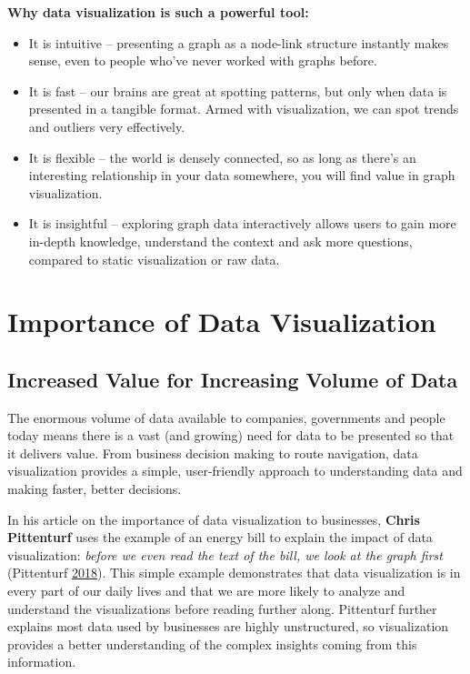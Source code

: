\documentclass[]{book}
\providecommand{\tightlist}{%
  \setlength{\itemsep}{0pt}\setlength{\parskip}{0pt}}
\theoremstyle{definition}
\theoremstyle{definition}
\theoremstyle{definition}
\theoremstyle{remark}
\begin{document}
\textbf{Why data visualization is such a powerful tool:}

\begin{itemize}
\tightlist
\item
  It is intuitive -- presenting a graph as a node-link structure
  instantly makes sense, even to people who've never worked with graphs
  before.
\item
  It is fast -- our brains are great at spotting patterns, but only when
  data is presented in a tangible format. Armed with visualization, we
  can spot trends and outliers very effectively.
\item
  It is flexible -- the world is densely connected, so as long as
  there's an interesting relationship in your data somewhere, you will
  find value in graph visualization.
\item
  It is insightful -- exploring graph data interactively allows users to
  gain more in-depth knowledge, understand the context and ask more
  questions, compared to static visualization or raw data.
\end{itemize}

\section{Importance of Data
Visualization}\label{importance-of-data-visualization}

\subsection{Increased Value for Increasing Volume of
Data}\label{increased-value-for-increasing-volume-of-data}

The enormous volume of data available to companies, governments and
people today means there is a vast (and growing) need for data to be
presented so that it delivers value. From business decision making to
route navigation, data visualization provides a simple, user-friendly
approach to understanding data and making faster, better decisions.

In his article on the importance of data visualization to businesses,
\textbf{Chris Pittenturf} uses the example of an energy bill to explain
the impact of data visualization: \emph{before we even read the text of
the bill, we look at the graph first} (Pittenturf
\protect\hyperlink{ref-viz_importance}{2018}). This simple example
demonstrates that data visualization is in every part of our daily lives
and that we are more likely to analyze and understand the visualizations
before reading further along. Pittenturf further explains most data used
by businesses are highly unstructured, so visualization provides a
better understanding of the complex insights coming from this
information.
\end{document}
